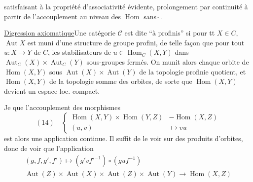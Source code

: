 satisfaisant à la propriété d'associativité évidente,  prolongement par continuité à partir de l'accouplement au niveau des $\operatorname{Hom}$ sans $\hat{\ }$. 

\uline{Digression axiomatique}\quad Une catégorie $\mathcal{C}$ est dite   ``à   profinis'' si pour tt $X\in C$, $\operatorname{Aut}X$ est muni d'une structure de groupe profini, de telle façon que pour tout $u:X\longrightarrow Y$ de $C$, les stabilisateurs de $u\in\operatorname{Hom}_C(X,Y)$ dans $\operatorname{Aut}_C(X)\times\operatorname{Aut}_C(Y)$    sous-groupes fermés.  On munit alors chaque orbite de $\operatorname{Hom}(X,Y)$ sous $\operatorname{Aut}(X)\times\operatorname{Aut}(Y)$ de la topologie profinie quotient, et $\operatorname{Hom}(X,Y)$ de la topologie  somme des orbites, de sorte que $\operatorname{Hom}(X,Y)$ devient un espace loc. compact.

Je   que l'accouplement des morphismes
\[
(14)\quad\left\{
\begin{aligned}
\operatorname{Hom}(X,Y)\times\operatorname{Hom}(Y,Z)&\mathbin{-}\operatorname{Hom}(X,Z)\\
(u,v)&\longmapsto vu
\end{aligned}\right.
\]
est alors  une  application continue. Il suffit de le voir sur des produits d'orbites, donc de voir que  l'application
\[
\begin{gathered}
(g,f,g',f')\longmapsto(g'vf'^{-1})\circ(guf^{-1})\\
\operatorname{Aut}(Z)\times\operatorname{Aut}(X)\times\operatorname{Aut}(Z)\times\operatorname{Aut}(Y)\longrightarrow\operatorname{Hom}(X,Z)
\end{gathered}
\]
